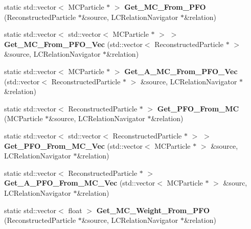 \begin{DoxyCompactItemize}
\item 
\hypertarget{classToolSet_1_1CRC_ab931816f16f8767329774a8309709d3c}{
static std::vector$<$ MCParticle $\ast$ $>$ {\bfseries Get\_\-MC\_\-From\_\-PFO} (ReconstructedParticle $\ast$\&source, LCRelationNavigator $\ast$\&relation)}
\label{classToolSet_1_1CRC_ab931816f16f8767329774a8309709d3c}

\item 
\hypertarget{classToolSet_1_1CRC_a09c33fa93c99c29e9157bf915625108a}{
static std::vector$<$ std::vector$<$ MCParticle $\ast$ $>$ $>$ {\bfseries Get\_\-MC\_\-From\_\-PFO\_\-Vec} (std::vector$<$ ReconstructedParticle $\ast$ $>$ \&source, LCRelationNavigator $\ast$\&relation)}
\label{classToolSet_1_1CRC_a09c33fa93c99c29e9157bf915625108a}

\item 
\hypertarget{classToolSet_1_1CRC_acab3f644700643fa2b2967365748d0df}{
static std::vector$<$ MCParticle $\ast$ $>$ {\bfseries Get\_\-A\_\-MC\_\-From\_\-PFO\_\-Vec} (std::vector$<$ ReconstructedParticle $\ast$ $>$ \&source, LCRelationNavigator $\ast$\&relation)}
\label{classToolSet_1_1CRC_acab3f644700643fa2b2967365748d0df}

\item 
\hypertarget{classToolSet_1_1CRC_a1e8af238303782e448edc47f58fb01ab}{
static std::vector$<$ ReconstructedParticle $\ast$ $>$ {\bfseries Get\_\-PFO\_\-From\_\-MC} (MCParticle $\ast$\&source, LCRelationNavigator $\ast$\&relation)}
\label{classToolSet_1_1CRC_a1e8af238303782e448edc47f58fb01ab}

\item 
\hypertarget{classToolSet_1_1CRC_adb838e10bbaaabbcc8bba3b2cf3b67f8}{
static std::vector$<$ std::vector$<$ ReconstructedParticle $\ast$ $>$ $>$ {\bfseries Get\_\-PFO\_\-From\_\-MC\_\-Vec} (std::vector$<$ MCParticle $\ast$ $>$ \&source, LCRelationNavigator $\ast$\&relation)}
\label{classToolSet_1_1CRC_adb838e10bbaaabbcc8bba3b2cf3b67f8}

\item 
\hypertarget{classToolSet_1_1CRC_a0b26baca07714b53f86982be73121faa}{
static std::vector$<$ ReconstructedParticle $\ast$ $>$ {\bfseries Get\_\-A\_\-PFO\_\-From\_\-MC\_\-Vec} (std::vector$<$ MCParticle $\ast$ $>$ \&sourc, LCRelationNavigator $\ast$\&relation)}
\label{classToolSet_1_1CRC_a0b26baca07714b53f86982be73121faa}

\item 
\hypertarget{classToolSet_1_1CRC_aa8c717051631a9f7e31097e458c060ad}{
static std::vector$<$ float $>$ {\bfseries Get\_\-MC\_\-Weight\_\-From\_\-PFO} (ReconstructedParticle $\ast$\&source, LCRelationNavigator $\ast$\&relation)}
\label{classToolSet_1_1CRC_aa8c717051631a9f7e31097e458c060ad}


\end{DoxyCompactItemize}
